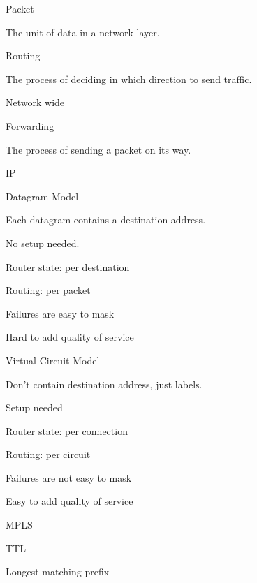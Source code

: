 \documentclass[main.tex]{subfiles}
\begin{document}
\small


\begin{card}{Packet}
\item The unit of data in a network layer.
\end{card}

\begin{card}{Routing}
\item The process of deciding in which direction to send traffic.
\item Network wide
\end{card}

\begin{card}{Forwarding}
\item The process of sending a packet on its way.
\end{card}

\begin{card}{IP}
\TODO
\end{card}

\begin{card}{Datagram Model}
\item Each datagram contains a destination address.
\item No setup needed.
\item Router state: per destination
\item Routing: per packet
\item Failures are easy to mask
\item Hard to add quality of service
\end{card}

\begin{card}{Virtual Circuit Model}
\item Don't contain destination address, just labels.
\item Setup needed
\item Router state: per connection
\item Routing: per circuit
\item Failures are not easy to mask
\item Easy to add quality of service
\end{card}

\begin{card}{MPLS}
\TODO
\end{card}

\begin{card}{TTL}
\TODO
\end{card}

\begin{card}{Longest matching prefix}
\TODO
\end{card}
\end{document}
